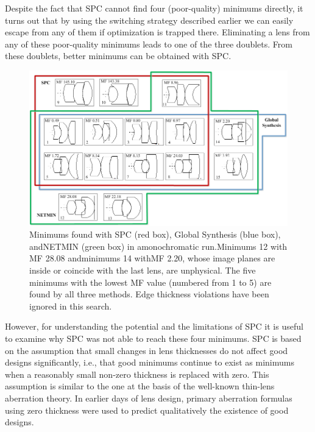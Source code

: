 Despite the fact that SPC cannot find four (poor-quality) minimums directly, it turns out that by using the switching strategy described earlier we can easily escape from any of them if optimization is trapped there. Eliminating a lens from any of these poor-quality minimums leads to one of the three doublets. From these doublets, better minimums can be obtained with SPC.
\begin{figure}[h!]
    \centering
    \includegraphics[width=1.0\textwidth]{chapter-3/figures/TripletMoNoNetwork.png}
    \caption{Minimums found with SPC (red box), Global Synthesis (blue box), andNETMIN (green box) in amonochromatic run.Minimums 12 with MF 28.08 andminimums 14 withMF 2.20, whose image planes are inside or coincide with the last lens, are unphysical. The five minimums with the lowest MF value (numbered from 1 to 5) are found by all three methods. Edge thickness violations have been ignored in this search.}
    \label{fig:TripletMonoNetwork}
\end{figure}

However, for understanding the potential and the limitations of SPC it is useful to examine why SPC was not able to reach these four minimums. SPC is based on the assumption that small changes in lens thicknesses do not affect good designs significantly, i.e., that good minimums continue to exist as minimums when a reasonably small non-zero thickness is replaced with zero. This assumption is similar to the one at the basis of the well-known thin-lens aberration theory. In earlier days of lens design, primary aberration formulas using zero thickness were used to predict qualitatively the existence of good designs.

